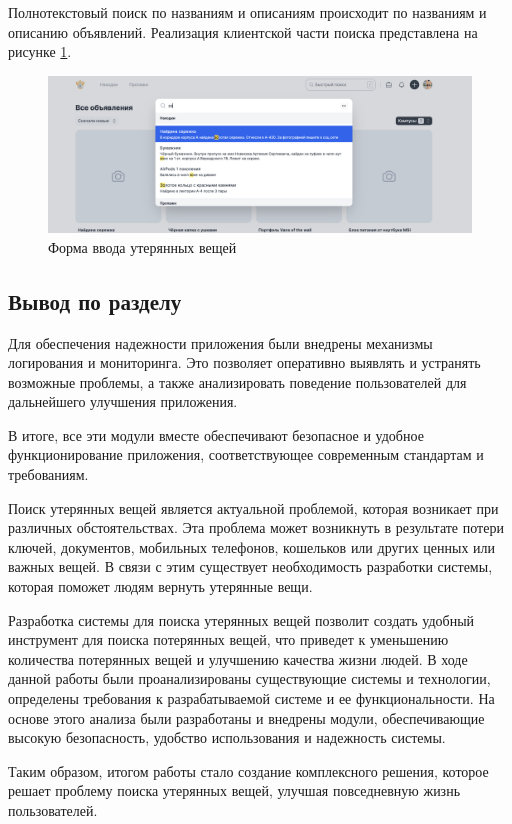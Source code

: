 Полнотекстовый поиск по названиям и описаниям происходит по названиям и описанию объявлений. Реализация клиентской части поиска представлена на рисунке \ref{fig:search-page}.

\begin{figure}[htb]
	\centering
	\includegraphics[width=.95\textwidth]{images/search-page.png}
	\parskip=6pt
	\caption{Форма ввода утерянных вещей}
	\label{fig:search-page}
\end{figure}

\subsection*{Вывод по разделу}

Для обеспечения надежности приложения были внедрены механизмы логирования и мониторинга. Это позволяет оперативно выявлять и устранять возможные проблемы, а также анализировать поведение пользователей для дальнейшего улучшения приложения.

В итоге, все эти модули вместе обеспечивают безопасное и удобное функционирование приложения, соответствующее современным стандартам и требованиям.

Поиск утерянных вещей является актуальной проблемой, которая возникает при различных обстоятельствах. Эта проблема может возникнуть в результате потери ключей, документов, мобильных телефонов, кошельков или других ценных или важных вещей. В связи с этим существует необходимость разработки системы, которая поможет людям вернуть утерянные вещи.

Разработка системы для поиска утерянных вещей позволит создать удобный инструмент для поиска потерянных вещей, что приведет к уменьшению количества потерянных вещей и улучшению качества жизни людей. В ходе данной работы были проанализированы существующие системы и технологии, определены требования к разрабатываемой системе и ее функциональности. На основе этого анализа были разработаны и внедрены модули, обеспечивающие высокую безопасность, удобство использования и надежность системы.

Таким образом, итогом работы стало создание комплексного решения, которое решает проблему поиска утерянных вещей, улучшая повседневную жизнь пользователей.